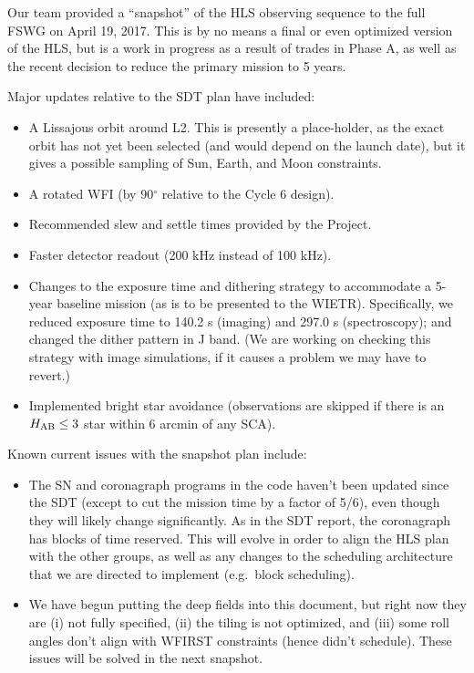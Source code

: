 \begin{summaryii}
Our team provided a ``snapshot'' of the HLS observing sequence to the full FSWG
on April 19, 2017. This is by no means a final or even optimized version of the
HLS, but is a work in progress as a result of trades in Phase A, as well as the
recent decision to reduce the primary mission to 5 years.
\end{summaryii}

Major updates relative to the SDT plan have included:
\begin{itemize}
\item A Lissajous orbit around L2. This is presently a place-holder, as the exact orbit has not yet been selected (and would depend on the launch date), but it gives a possible sampling of Sun, Earth, and Moon constraints.
\item A rotated WFI (by 90$^\circ$ relative to the Cycle 6 design).
\item Recommended slew and settle times provided by the Project.
\item Faster detector readout (200 kHz instead of 100 kHz).
\item Changes to the exposure time and dithering strategy to accommodate a
5-year baseline mission (as is to be presented to the WIETR). Specifically, we
reduced exposure time to 140.2 s (imaging) and 297.0 s (spectroscopy); and
changed the dither pattern in J band. (We are working on checking this strategy
with image simulations, if it causes a problem we may have to revert.)
\item Implemented bright star avoidance (observations are skipped if there is an $H_{\rm AB}\le 3$ star within 6 arcmin of any SCA).
\end{itemize}
Known current issues with the snapshot plan include:
\begin{itemize}
\item
The SN and coronagraph programs in the code haven't been updated since the SDT
(except to cut the mission time by a factor of 5/6), even though they will
likely change significantly. As in the SDT report, the coronagraph has blocks of
time reserved. This will evolve in order to align the HLS plan with the other
groups, as well as any changes to the scheduling architecture that we are
directed to implement (e.g.\ block scheduling).
\item
We have begun putting the deep fields into this document, but right now they are
(i) not fully specified, (ii) the tiling is not optimized, and (iii) some roll
angles don't align with WFIRST constraints (hence didn't schedule). These issues
will be solved in the next snapshot.
\end{itemize}

